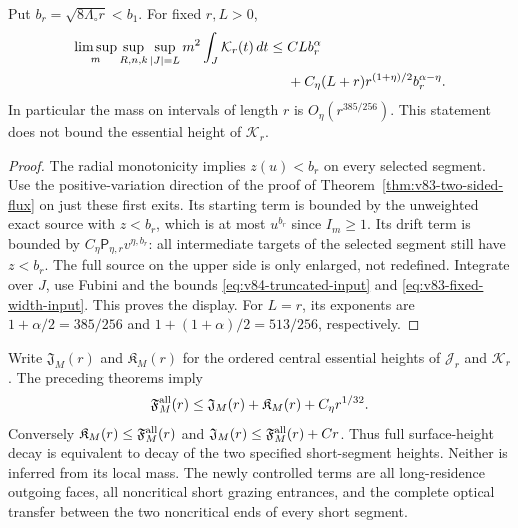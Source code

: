 \begin{proposition}
\label{prop:v84-critical-mass}
Put $b_r=\sqrt{8\Lambda_\circ r}<b_1$. For fixed $r,L>0$,
\begin{align}
 \limsup_m\sup_{R,n,k}\sup_{|J|=L}m^2\int_J\mathcal K_r(t)\,dt
 \le{}& C Lb_r^\alpha\notag\\
       &+C_\eta(L+r)r^{(1+\eta)/2}b_r^{\alpha-\eta}.
                                           \label{eq:v84-critical-mass}
\end{align}
In particular the mass on intervals of length $r$ is
$O_\eta(r^{385/256})$. This statement does not bound the essential
height of $\mathcal K_r$.
\end{proposition}
\begin{proof}
The radial monotonicity implies $z(u)<b_r$ on every selected segment.
Use the positive-variation direction of the proof of
Theorem~\ref{thm:v83-two-sided-flux} on just these first exits.
Its starting term is bounded by the unweighted exact source with
$z<b_r$, which is at most $u^{b_r}$ since $I_m\ge1$.
Its drift term is bounded by
$C_\eta\mathsf P_{\eta,r}v^{\eta,b_r}$: all intermediate targets
of the selected segment still have $z<b_r$. The full source on the
upper side is only enlarged, not redefined. Integrate over $J$,
use Fubini and the bounds \eqref{eq:v84-truncated-input} and
\eqref{eq:v83-fixed-width-input}. This proves the display. For
$L=r$, its exponents are $1+\alpha/2=385/256$ and
$1+(1+\alpha)/2=513/256$, respectively.
\end{proof}

Write $\mathfrak J_M(r)$ and $\mathfrak K_M(r)$ for the ordered
central essential heights of $\mathcal J_r$ and $\mathcal K_r$.
The preceding theorems imply
\begin{equation}\label{eq:v84-surface-reduction}
 \mathfrak F_M^{\rm all}(r)
       \le\mathfrak J_M(r)+\mathfrak K_M(r)+C_\eta r^{1/32}.
\end{equation}
Conversely $\mathfrak K_M(r)\le\mathfrak F_M^{\rm all}(r)$ and
$\mathfrak J_M(r)\le\mathfrak F_M^{\rm all}(r)+Cr$.
Thus full surface-height decay is equivalent to decay of the two
specified short-segment heights. Neither is inferred from its local
mass. The newly controlled terms are all long-residence outgoing
faces, all noncritical short grazing entrances, and the complete
optical transfer between the two noncritical ends of every short
segment.
